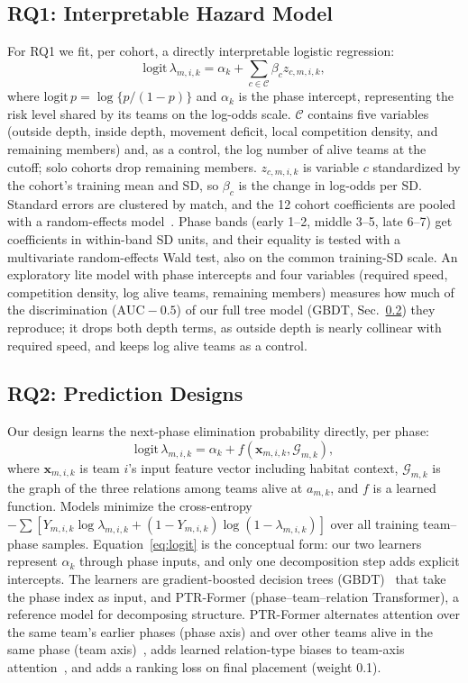 \documentclass[sigconf,anonymous,nonacm]{acmart}
\begin{document}
\subsection{RQ1: Interpretable Hazard Model}
\label{sec:method:rq1}
For RQ1 we fit, per cohort, a directly interpretable logistic regression:
\begin{equation}
\mathrm{logit}\,\lambda_{m,i,k}=\alpha_k+\textstyle\sum_{c\in\mathcal{C}}\beta_c z_{c,m,i,k},
\label{eq:ehm}
\end{equation}
where $\mathrm{logit}\,p=\log\{p/(1-p)\}$ and $\alpha_k$ is the phase intercept, representing the risk level shared by its teams on the log-odds scale.
$\mathcal{C}$ contains five variables (outside depth, inside depth, movement deficit, local competition density, and remaining members) and, as a control, the log number of alive teams at the cutoff; solo cohorts drop remaining members.
$z_{c,m,i,k}$ is variable $c$ standardized by the cohort's training mean and SD, so $\beta_c$ is the change in log-odds per SD.
Standard errors are clustered by match, and the 12 cohort coefficients are pooled with a random-effects model~\cite{DerSimonian86}.
Phase bands (early 1--2, middle 3--5, late 6--7) get coefficients in within-band SD units, and their equality is tested with a multivariate random-effects Wald test, also on the common training-SD scale.
An exploratory lite model with phase intercepts and four variables (required speed, competition density, log alive teams, remaining members) measures how much of the discrimination ($\mathrm{AUC}-0.5$) of our full tree model (GBDT, Sec.~\ref{sec:method:rq2}) they reproduce; it drops both depth terms, as outside depth is nearly collinear with required speed, and keeps log alive teams as a control.

\subsection{RQ2: Prediction Designs}
\label{sec:method:rq2}
Our design learns the next-phase elimination probability directly, per phase:
\begin{equation}
\mathrm{logit}\,\lambda_{m,i,k}=\alpha_k+f(\mathbf{x}_{m,i,k},\mathcal{G}_{m,k}),
\label{eq:logit}
\end{equation}
where $\mathbf{x}_{m,i,k}$ is team $i$'s input feature vector including habitat context, $\mathcal{G}_{m,k}$ is the graph of the three relations among teams alive at $a_{m,k}$, and $f$ is a learned function.
Models minimize the cross-entropy $-\sum[Y_{m,i,k}\log\lambda_{m,i,k}+(1-Y_{m,i,k})\log(1-\lambda_{m,i,k})]$ over all training team--phase samples.
Equation~\eqref{eq:logit} is the conceptual form: our two learners represent $\alpha_k$ through phase inputs, and only one decomposition step adds explicit intercepts. The learners are gradient-boosted decision trees (GBDT)~\cite{Friedman01} that take the phase index as input, and PTR-Former (phase--team--relation Transformer), a reference model for decomposing structure.
PTR-Former alternates attention over the same team's earlier phases (phase axis) and over other teams alive in the same phase (team axis)~\cite{Vaswani17}, adds learned relation-type biases to team-axis attention~\cite{Ying21}, and adds a ranking loss on final placement (weight 0.1).
\end{document}
